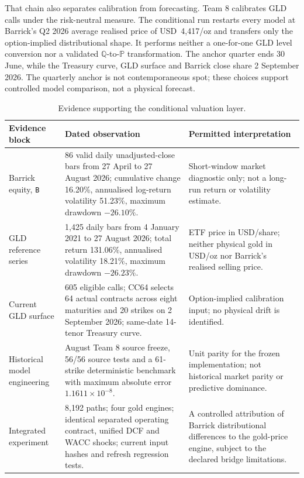 That chain also separates calibration from forecasting. Team 8 calibrates GLD
calls under the risk-neutral measure. The conditional run restarts every model
at Barrick's Q2 2026 average realised price of USD~4,417/oz and transfers only
the option-implied distributional shape. It performs neither a one-for-one GLD
level conversion nor a validated $\mathbb Q$-to-$\mathbb P$ transformation.
The anchor quarter ends 30 June, while the Treasury curve, GLD surface and
Barrick close share 2 September 2026. The quarterly anchor is not contemporaneous
spot; these choices support controlled model comparison, not a physical forecast.

\begin{table}[H]
\centering
\caption{Evidence supporting the conditional valuation layer.}
\label{tab:discoveries-evidence}
\small
\renewcommand{\arraystretch}{1.13}
\begin{tabularx}{\textwidth}{@{}p{2.65cm}X X@{}}
\toprule
\textbf{Evidence block} & \textbf{Dated observation} &
\textbf{Permitted interpretation} \\
\midrule
Barrick equity, \texttt{B} & 86 valid daily unadjusted-close bars from
27 April to 27 August 2026; cumulative change 16.20\%, annualised log-return
volatility 51.23\%, maximum drawdown $-26.10\%$. & Short-window market
diagnostic only; not a long-run return or volatility estimate. \\
GLD reference series & 1,425 daily bars from 4 January 2021 to 27 August 2026;
total return 131.06\%, annualised volatility 18.21\%, maximum drawdown
$-26.23\%$. & ETF price in USD/share; neither physical gold in USD/oz nor
Barrick's realised selling price. \\
Current GLD surface & 605 eligible calls; CC64 selects 64 actual contracts
across eight maturities and 20 strikes on 2 September 2026; same-date 14-tenor
Treasury curve. & Option-implied calibration input; no physical drift is identified. \\
Historical model engineering & August Team 8 source freeze, 56/56 source tests and a
61-strike deterministic benchmark with maximum absolute error
$1.1611\times10^{-8}$. & Unit parity for the frozen implementation; not
historical market parity or predictive dominance. \\
Integrated experiment & 8,192 paths; four gold engines; identical separated
operating contract, unified DCF and WACC shocks; current input hashes and refresh regression tests. & A controlled attribution of Barrick distributional differences
to the gold-price engine, subject to the declared bridge limitations. \\
\bottomrule
\end{tabularx}
\end{table}

